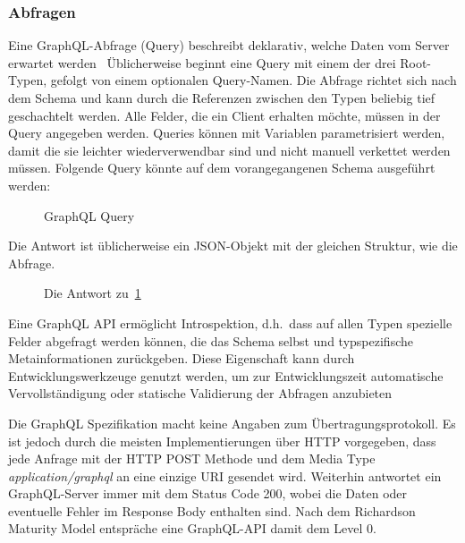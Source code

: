\subsubsection{Abfragen}
Eine GraphQL-Abfrage (Query) beschreibt deklarativ, welche Daten vom Server erwartet werden~\cite[vgl.][]{GraphQL-spec-github}
Üblicherweise beginnt eine Query mit einem der drei Root-Typen, gefolgt von einem optionalen Query-Namen.
Die Abfrage richtet sich nach dem Schema und kann durch die Referenzen zwischen den Typen beliebig tief geschachtelt werden.
Alle Felder, die ein Client erhalten möchte, müssen in der Query angegeben werden.
Queries können mit Variablen parametrisiert werden, damit die sie leichter wiederverwendbar sind und nicht manuell verkettet werden müssen.
Folgende Query könnte auf dem vorangegangenen Schema ausgeführt werden:
\begin{figure}[h]
  \centering
  \caption{GraphQL Query}\label{img:graphql-query}
\end{figure}
\par
Die Antwort ist üblicherweise ein JSON-Objekt mit der gleichen Struktur, wie die Abfrage.
\begin{figure}[h]
  \centering
  \caption{Die Antwort zu~\ref{img:graphql-query}}\label{img:graphql-response}
\end{figure}
\par
Eine GraphQL API ermöglicht Introspektion, d.h.\ dass auf allen Typen spezielle Felder abgefragt werden können, die das Schema selbst und typspezifische Metainformationen zurückgeben.
Diese Eigenschaft kann durch Entwicklungswerkzeuge genutzt werden, um zur Entwicklungszeit automatische Vervollständigung oder statische Validierung der Abfragen anzubieten~\cite[vgl.][]{Postman-GraphQL}
\par
Die GraphQL Spezifikation macht keine Angaben zum Übertragungsprotokoll.
Es ist jedoch durch die meisten Implementierungen über HTTP vorgegeben, dass jede Anfrage mit der HTTP POST Methode und dem Media Type \emph{application/graphql} an eine einzige URI gesendet wird.
Weiterhin antwortet ein GraphQL-Server immer mit dem Status Code 200, wobei die Daten oder eventuelle Fehler im Response Body enthalten sind.
Nach dem Richardson Maturity Model entspräche eine GraphQL-API damit dem Level 0.

